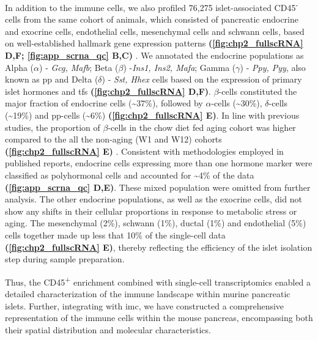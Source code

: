 \par In addition to the immune cells, we also profiled 76,275 islet-associated CD45\textsuperscript{-} cells from the same cohort of animals, which consisted of pancreatic endocrine and exocrine cells, endothelial cells, mesenchymal cells and schwann cells, based on well-established hallmark gene expression patterns \textbf{(\autoref{fig:chp2_fullscRNA} D,F; \autoref{fig:app_scrna_qc} B,C)} \textbf{\cite{van_gurp_generation_2022}}. We annotated the endocrine populations as Alpha ($\alpha$) - \textit{Gcg, Mafb}; Beta ($\beta$) -\textit{Ins1, Ins2, Mafa}; Gamma ($\gamma$) - \textit{Ppy, Pyy}, also known as \gls{pp} and Delta ($\delta$) - \textit{Sst, Hhex} cells based on the expression of primary islet hormones and \glspl{tf} \textbf{(\autoref{fig:chp2_fullscRNA} D,F)}. $\beta$-cells constituted the major fraction of endocrine cells (\textasciitilde37\%), followed by $\alpha$-cells (\textasciitilde30\%), $\delta$-cells (\textasciitilde19\%) and \gls{pp}-cells (\textasciitilde6\%) \textbf{(\autoref{fig:chp2_fullscRNA} E)}. In line with previous studies, the proportion of $\beta$-cells in the chow diet fed aging cohort was higher compared to the all the non-aging (W1 and W12) cohorts \textbf{(\autoref{fig:chp2_fullscRNA} E)} \textbf{\cite{}}. Consistent with methodologies employed in published reports, endocrine cells expressing more than one hormone marker were classified as polyhormonal cells and accounted for \textasciitilde4\% of the data \textbf{(\autoref{fig:app_scrna_qc} D,E)}. These mixed population were omitted from further analysis. The other endocrine populations, as well as the exocrine cells, did not show any shifts in their cellular proportions in response to metabolic stress or aging. The mesenchymal (2\%), schwann (1\%), ductal (1\%) and endothelial (5\%) cells together made up less that 10\% of the single-cell data \textbf{(\autoref{fig:chp2_fullscRNA} E)}, thereby reflecting the efficiency of the islet isolation step during sample preparation.\\
\par Thus, the CD45\textsuperscript{+} enrichment combined with single-cell transcriptomics enabled a detailed characterization of the immune landscape within murine pancreatic islets. Further, integrating with \gls{imc}, we have constructed a comprehensive representation of the immune cells within the mouse pancreas, encompassing both their spatial distribution and molecular characteristics. 


